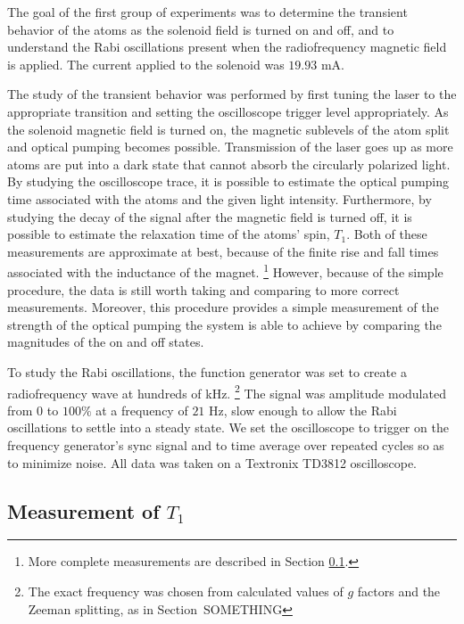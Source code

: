 The goal of the first group of experiments was to determine the transient behavior of the atoms as the solenoid field is turned on and off, and to understand the Rabi oscillations present when the radiofrequency magnetic field is applied. The current applied to the solenoid was $19.93$ mA.

The study of the transient behavior was performed by first tuning the laser to the appropriate transition and setting the oscilloscope trigger level appropriately. As the solenoid magnetic field is turned on, the magnetic sublevels of the atom split and optical pumping becomes possible. Transmission of the laser goes up as more atoms are put into a dark state that cannot absorb the circularly polarized light. By studying the oscilloscope trace, it is possible to estimate the optical pumping time associated with the atoms and the given light intensity. Furthermore, by studying the decay of the signal after the magnetic field is turned off, it is possible to estimate the relaxation time of the atoms' spin, $T_{1}$. Both of these measurements are approximate at best, because of the finite rise and fall times associated with the inductance of the magnet. \footnote{More complete measurements are described in Section \ref{measurementoft1}.} However, because of the simple procedure, the data is still worth taking and comparing to more correct measurements. Moreover, this procedure provides a simple measurement of the strength of the optical pumping the system is able to achieve by comparing the magnitudes of the on and off states.

To study the Rabi oscillations, the function generator was set to create a radiofrequency wave at hundreds of kHz. \footnote{The exact frequency was chosen from calculated values of $g$ factors and the Zeeman splitting, as in Section~SOMETHING} The signal was amplitude modulated from $0$ to $100\%$ at a frequency of $21$ Hz, slow enough to allow the Rabi oscillations to settle into a steady state. We set the oscilloscope to trigger on the frequency generator's sync signal and to time average over repeated cycles so as to minimize noise. All data was taken on a Textronix TD3812 oscilloscope.

\subsection{Measurement of $T_{1}$}\label{measurementoft1}

